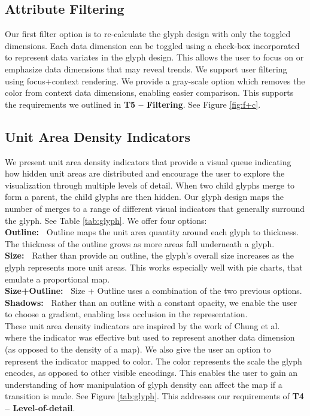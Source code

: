 \subsection{Attribute Filtering} \label{sec:filter}
Our first filter option is to re-calculate the glyph design with only the toggled dimensions. Each data dimension can be toggled using a check-box incorporated to represent data variates in the glyph design. This allows the user to focus on or emphasize data dimensions that may reveal trends. We support user filtering using focus+context rendering. We provide a gray-scale option which removes the color from context data dimensions, enabling easier comparison. This supports the requirements we outlined in \textbf{T5 -- Filtering}. See Figure \ref{fig:f+c}.

\subsection{Unit Area Density Indicators} \label{sec:indicate}
We present unit area density indicators that provide a visual queue indicating how hidden unit areas are distributed and encourage the user to explore the visualization through multiple levels of detail. When two child glyphs merge to form a parent, the child glyphs are then hidden. Our glyph design maps the number of merges to a range of different visual indicators that generally surround the glyph. See Table \ref{tab:glyph}. We offer four options:\\
\textbf{Outline:~} Outline maps the unit area quantity around each glyph to thickness. The thickness of the outline grows as more areas fall underneath a glyph.\\
\textbf{Size:~} Rather than provide an outline, the glyph's overall size increases as the glyph represents more unit areas. This works especially well with pie charts, that emulate a proportional map. \\
\textbf{Size+Outline:~} Size + Outline uses a combination of the two previous options.\\
\textbf{Shadows:~} Rather than an outline with a constant opacity, we enable the user to choose a gradient, enabling less occlusion in the representation.\\
These unit area density indicators are inspired by the work of Chung et al.\ \cite{chung2015glyph} where the indicator was effective but used to represent another data dimension (as opposed to the density of a map).
We also give the user an option to represent the indicator mapped to color. The color represents the scale the glyph encodes, as opposed to other visible encodings. This enables the user to gain an understanding of how manipulation of glyph density can affect the map if a transition is made. See Figure \ref{tab:glyph}. This addresses our requirements of \textbf{T4 -- Level-of-detail}.

